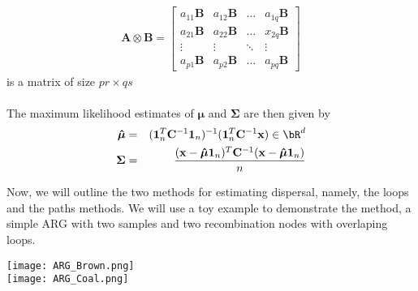 \begin{eqnarray*}
    \mathbf{A \otimes B} = \begin{bmatrix}
    a_{11}\mathbf{B} & a_{12}\mathbf{B} & \hdots & a_{1q}\mathbf{B} \\
    a_{21}\mathbf{B} & a_{22}\mathbf{B} & \hdots & x_{2q}\mathbf{B} \\
    \vdots & \vdots &\ddots & \vdots \\ 
    a_{p1}\mathbf{B} & a_{p2}\mathbf{B} & \hdots & a_{pq}\mathbf{B}
\end{bmatrix} 
\end{eqnarray*}
is a matrix of size $pr \times qs$\\ \\
The maximum likelihood estimates of $\boldsymbol{\mu}$ and $\boldsymbol{\Sigma}$ are then given by 
\begin{eqnarray*}
\boldsymbol{\hat{\mu}} &=& (\mathbf{1}_n^T\mathbf{C}^{-1}\mathbf{1}_n)^{-1} ( \mathbf{1}_n^T\mathbf{C}^{-1}\mathbf{x} ) \in \bR^d \\
\boldsymbol{\Sigma} &=& \frac{(\mathbf{x} - \boldsymbol{\hat{\mu}}\mathbf{1}_n )^T \mathbf{C}^{-1} (\mathbf{x} - \boldsymbol{\hat{\mu}}\mathbf{1}_n )}{n}
\end{eqnarray*}

Now, we will outline the two methods for estimating dispersal, namely, the loops and the paths methods. We will use a toy example to demonstrate the method, a simple ARG with two samples and two recombination nodes with overlaping loops. 

\begin{center}
\texttt{[image: ARG\_Brown.png]} \\
\texttt{[image: ARG\_Coal.png]}
\end{center}

